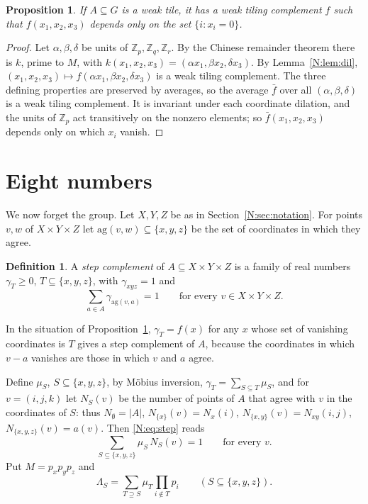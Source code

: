\documentclass[11pt,a4paper]{amsart}
\newtheorem{proposition}[theorem]{Proposition}
\theoremstyle{definition}
\newtheorem{definition}[theorem]{Definition}
\theoremstyle{remark}
\newcommand{\Z}{\mathbb{Z}}
\begin{document}
\begin{proposition}\label{N:prop:step}
If $A\subseteq G$ is a weak tile, it has a weak tiling complement $f$ such that $f(x_1,x_2,x_3)$ depends only on
the set $\{i : x_i=0\}$.
\end{proposition}
\begin{proof}
Let $\alpha,\beta,\delta$ be units of $\Z_p,\Z_q,\Z_r$. By the Chinese remainder theorem there is $k$, prime to
$M$, with $k(x_1,x_2,x_3)=(\alpha x_1,\beta x_2,\delta x_3)$. By Lemma~\ref{N:lem:dil},
$(x_1,x_2,x_3)\mapsto f(\alpha x_1,\beta x_2,\delta x_3)$ is a weak tiling complement. The three defining
properties are preserved by averages, so the average $\bar f$ over all $(\alpha,\beta,\delta)$ is a weak tiling
complement. It is invariant under each coordinate dilation, and the units of $\Z_p$ act transitively on the
nonzero elements; so $\bar f(x_1,x_2,x_3)$ depends only on which $x_i$ vanish.
\end{proof}

\section{Eight numbers}\label{N:sec:eight}

We now forget the group. Let $X,Y,Z$ be as in Section~\ref{N:sec:notation}. For points $v,w$ of $X\times Y\times Z$
let $\mathrm{ag}(v,w)\subseteq\{x,y,z\}$ be the set of coordinates in which they agree.

\begin{definition}
A \emph{step complement} of $A\subseteq X\times Y\times Z$ is a family of real numbers $\gamma_T\ge 0$,
$T\subseteq\{x,y,z\}$, with $\gamma_{xyz}=1$ and
\begin{equation}\label{N:eq:step}
 \sum_{a\in A}\gamma_{\mathrm{ag}(v,a)}=1\qquad\text{for every } v\in X\times Y\times Z .
\end{equation}
\end{definition}

In the situation of Proposition~\ref{N:prop:step}, $\gamma_T=f(x)$ for any $x$ whose set of vanishing coordinates
is $T$ gives a step complement of $A$, because the coordinates in which $v-a$ vanishes are those in which $v$ and
$a$ agree.

Define $\mu_S$, $S\subseteq\{x,y,z\}$, by M\"obius inversion, $\gamma_T=\sum_{S\subseteq T}\mu_S$, and for
$v=(i,j,k)$ let $N_S(v)$ be the number of points of $A$ that agree with $v$ in the coordinates of $S$: thus
$N_\emptyset=|A|$, $N_{\{x\}}(v)=N_x(i)$, $N_{\{x,y\}}(v)=N_{xy}(i,j)$, $N_{\{x,y,z\}}(v)=a(v)$. Then
\eqref{N:eq:step} reads
\begin{equation}\label{N:eq:W}
 \sum_{S\subseteq\{x,y,z\}}\mu_S\,N_S(v)=1\qquad\text{for every } v .
\end{equation}
Put $M=p_xp_yp_z$ and
\[
 \Lambda_S=\sum_{T\supseteq S}\mu_T\prod_{i\notin T}p_i\qquad(S\subseteq\{x,y,z\}).
\]
\end{document}
